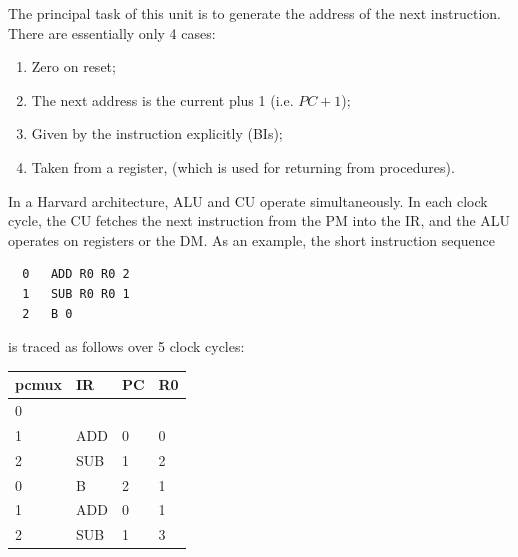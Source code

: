 The principal task of this unit is to generate the address of the next instruction. There are
essentially only 4 cases:
\begin{enumerate}
  \item Zero on reset;
  \item The next address is the current plus 1 (i.e. $PC+1$);
  \item Given by the instruction explicitly (BIs);
  \item Taken from a register, (which is used for returning from procedures).
\end{enumerate}

In a Harvard architecture, ALU and CU operate simultaneously. In each clock cycle, the CU fetches
the next instruction from the PM into the IR, and the ALU operates on registers or the DM. As an
example, the short instruction sequence
\begin{verbatim}
  0   ADD R0 R0 2
  1   SUB R0 R0 1
  2   B 0
\end{verbatim}
is traced as follows over 5 clock cycles:
\begin{table}[h!]
  \centering
  \begin{tabular}{l l l l}
    pcmux & IR & PC & R0 \\\hline
    0 \\
    1 & ADD & 0 & 0 \\
    2 & SUB & 1 & 2 \\
    0 & B   & 2 & 1 \\
    1 & ADD & 0 & 1 \\
    2 & SUB & 1 & 3
  \end{tabular}
\end{table}

